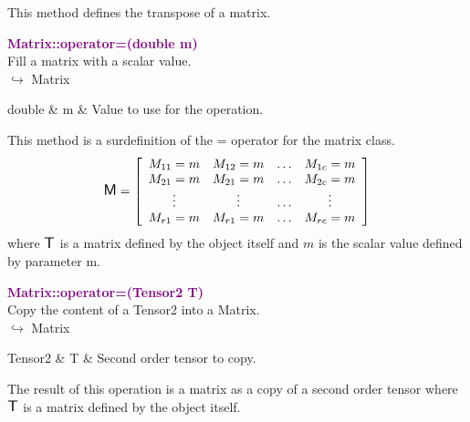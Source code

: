 This method defines the transpose of a matrix.

\textcolor{purple}{\textbf{Matrix::operator=(double m)}}\label{Matrix::operator=(double m)}\\
Fill a matrix with a scalar value.\\ \hspace*{10mm}$\hookrightarrow$ Matrix

\begin{tcolorbox}[width=\textwidth,myArgs,tabularx={ll|R}]
double & m & Value to use for the operation.
\end{tcolorbox}

This method is a surdefinition of the = operator for the matrix class.
\begin{equation*}
\mbox{\large\ensuremath{\mathsf{M}}}=\left[\begin{array}{cccc}
  M_{11}=m & M_{12}=m & \hdots & M_{1c}=m\\
  M_{21}=m & M_{21}=m & \hdots & M_{2c}=m\\
  \vdots & \vdots & \hdots & \vdots\\
  M_{r1}=m & M_{r1}=m & \hdots & M_{rc}=m
  \end{array}\right]
\end{equation*}
where $\mbox{\large\ensuremath{\mathsf{T}}}$ is a matrix defined by the object itself and $m$ is the scalar value defined by parameter m.

\textcolor{purple}{\textbf{Matrix::operator=(Tensor2 T)}}\label{Matrix::operator=(Tensor2 T)}\\
Copy the content of a Tensor2 into a Matrix.\\ \hspace*{10mm}$\hookrightarrow$ Matrix

\begin{tcolorbox}[width=\textwidth,myArgs,tabularx={ll|R}]
Tensor2 & T & Second order tensor to copy.
\end{tcolorbox}

The result of this operation is a matrix as a copy of a second order tensor where $\mbox{\large\ensuremath{\mathsf{T}}}$ is a matrix defined by the object itself.

